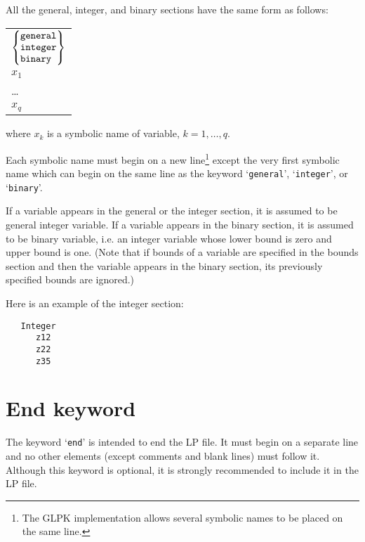 All the general, integer, and binary sections have the same form as
follows:

\begin{center}
\begin{tabular}{l}
$
\left\{
\begin{array}{@{}l@{}}
\verb|general| \\
\verb|integer| \\
\verb|binary | \\
\end{array}
\right\}
$ \\
\hspace{10pt}$x_1$ \\
\hspace{10pt}\dots \\
\hspace{10pt}$x_q$ \\
\end{tabular}
\end{center}

\noindent
where $x_k$ is a symbolic name of variable, $k=1,\dots,q$.

Each symbolic name must begin on a new line\footnote{The GLPK
implementation allows several symbolic names to be placed on the same
line.} except the very first symbolic name which can begin on the same
line as the keyword `\verb|general|', `\verb|integer|', or
`\verb|binary|'.


If a variable appears in the general or the integer section, it is
assumed to be general integer variable. If a variable appears in the
binary section, it is assumed to be binary variable, i.e. an integer
variable whose lower bound is zero and upper bound is one. (Note that
if bounds of a variable are specified in the bounds section and then
the variable appears in the binary section, its previously specified
bounds are ignored.)

Here is an example of the integer section:

\begin{verbatim}
   Integer
      z12
      z22
      z35
\end{verbatim}

\newpage

\section{End keyword}

The keyword `\verb|end|' is intended to end the LP file. It must begin
on a separate line and no other elements (except comments and blank
lines) must follow it. Although this keyword is optional, it is strongly
recommended to include it in the LP file.

